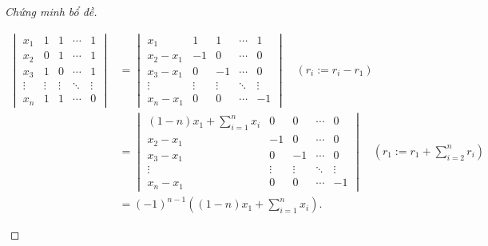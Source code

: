 \begin{proof}[Chứng minh bổ đề]
\begin{enumerate}[label = (\roman*)]
              \allowdisplaybreaks{}
              \begin{align*}
                  \begin{vmatrix}
                      x_{1}  & 1      & 1      & \cdots & 1      \\
                      x_{2}  & 0      & 1      & \cdots & 1      \\
                      x_{3}  & 1      & 0      & \cdots & 1      \\
                      \vdots & \vdots & \vdots & \ddots & \vdots \\
                      x_{n}  & 1      & 1      & \cdots & 0
                  \end{vmatrix}
                   & =
                  \begin{vmatrix}
                      x_{1}         & 1      & 1      & \cdots & 1      \\
                      x_{2} - x_{1} & -1     & 0      & \cdots & 0      \\
                      x_{3} - x_{1} & 0      & -1     & \cdots & 0      \\
                      \vdots        & \vdots & \vdots & \ddots & \vdots \\
                      x_{n} - x_{1} & 0      & 0      & \cdots & -1
                  \end{vmatrix}\quad(r_{i}:= r_{i} - r_{1})                                 \\
                   & =
                  \begin{vmatrix}
                      (1-n)x_{1} + \displaystyle\sum^{n}_{i=1}x_{i} & 0      & 0      & \cdots & 0      \\
                      x_{2} - x_{1}                                 & -1     & 0      & \cdots & 0      \\
                      x_{3} - x_{1}                                 & 0      & -1     & \cdots & 0      \\
                      \vdots                                        & \vdots & \vdots & \ddots & \vdots \\
                      x_{n} - x_{1}                                 & 0      & 0      & \cdots & -1
                  \end{vmatrix}\quad(r_{1}:= r_{1} + \sum^{n}_{i=2}r_{i}) \\
                   & = {(-1)}^{n-1}\left((1-n)x_{1} + \sum^{n}_{i=1}x_{i}\right).
              \end{align*}
              \endgroup{}


\end{enumerate}
\end{proof}
